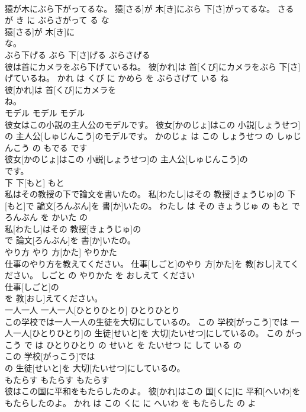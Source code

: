 \documentclass[8pt]{extreport}
\begin{document}
\begin{CJK}{UTF8}{min}
\\	猿が木にぶら下がってるな。	猿[さる]が 木[き]にぶら 下[さ]がってるな。	さる が き に ぶらさがって る な	
\\	猿[さる]が 木[き]に
\\	な。			
\\	ぶら下げる	ぶら 下[さ]げる	ぶらさげる	
\\	彼は首にカメラをぶら下げているね。	彼[かれ]は 首[くび]にカメラをぶら 下[さ]げているね。	かれ は くび に かめら を ぶらさげて いる ね	
\\	彼[かれ]は 首[くび]にカメラを
\\	ね。			
\\	モデル	モデル	モデル	
\\	彼女はこの小説の主人公のモデルです。	彼女[かのじょ]はこの 小説[しょうせつ]の 主人公[しゅじんこう]のモデルです。	かのじょ は この しょうせつ の しゅじんこう の もでる です	
\\	彼女[かのじょ]はこの 小説[しょうせつ]の 主人公[しゅじんこう]の
\\	です。			
\\	下	下[もと]	もと	
\\	私はその教授の下で論文を書いたの。	私[わたし]はその 教授[きょうじゅ]の 下[もと]で 論文[ろんぶん]を 書[か]いたの。	わたし は その きょうじゅ の もと で ろんぶん を かいた の	
\\	私[わたし]はその 教授[きょうじゅ]の
\\	で 論文[ろんぶん]を 書[か]いたの。			
\\	やり方	やり 方[かた]	やりかた	
\\	仕事のやり方を教えてください。	仕事[しごと]のやり 方[かた]を 教[おし]えてください。	しごと の やりかた を おしえて ください	
\\	仕事[しごと]の
\\	を 教[おし]えてください。			
\\	一人一人	一人一人[ひとりひとり]	ひとりひとり	
\\	この学校では一人一人の生徒を大切にしているの。	この 学校[がっこう]では 一人一人[ひとりひとり]の 生徒[せいと]を 大切[たいせつ]にしているの。	この がっこう で は ひとりひとり の せいと を たいせつ に して いる の	
\\	この 学校[がっこう]では
\\	の 生徒[せいと]を 大切[たいせつ]にしているの。			
\\	もたらす	もたらす	もたらす	
\\	彼はこの国に平和をもたらしたのよ。	彼[かれ]はこの 国[くに]に 平和[へいわ]をもたらしたのよ。	かれ は この くに に へいわ を もたらした の よ	

\end{CJK}
\end{document}
